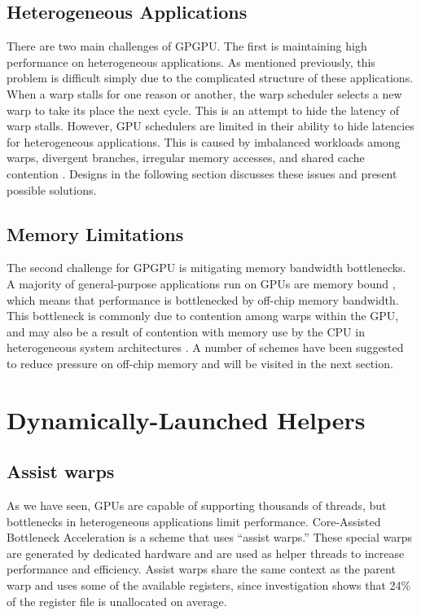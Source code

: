 \documentclass[prodmode,acmtecs]{acmsmall} %
\begin{document}
\subsection{Heterogeneous Applications}
There are two main challenges of GPGPU. The first is maintaining high
performance on heterogeneous applications. As mentioned previously, this problem
is difficult simply due to the complicated structure of these applications. When
a warp stalls for one reason or another, the warp scheduler selects a new warp
to take its place the next cycle. This is an attempt to hide the latency of warp
stalls. However, GPU schedulers are limited in their ability to hide latencies
for heterogeneous applications. This is caused by imbalanced workloads among
warps, divergent branches, irregular memory accesses, and shared cache
contention \cite{CoordinatedWarpScheduling}. Designs in the following section
discusses these issues and present possible solutions.

\subsection{Memory Limitations}
The second challenge for GPGPU is mitigating memory bandwidth bottlenecks. A
majority of general-purpose applications run on GPUs are memory bound
\cite{AssistWarps}, which means that performance is bottlenecked by off-chip
memory bandwidth. This bottleneck is commonly due to contention among warps
within the GPU, and may also be a result of contention with memory use by the
CPU in heterogeneous system architectures
\cite{ManagingConcurrencyInHeterogeneous}. A number of schemes have been
suggested to reduce pressure on off-chip memory and will be visited in the next
section.

\section{Dynamically-Launched Helpers} \label{sec:dynamic}
\subsection{Assist warps}
As we have seen, GPUs are capable of supporting thousands of threads, but
bottlenecks in heterogeneous applications limit performance. Core-Assisted
Bottleneck Acceleration \cite{AssistWarps} is a scheme that uses ``assist
warps.'' These special warps are generated by dedicated hardware and are used as
helper threads to increase performance and efficiency. Assist warps share the
same context as the parent warp and uses some of the available registers, since
investigation shows that 24\% of the register file is unallocated on average.
\end{document}
